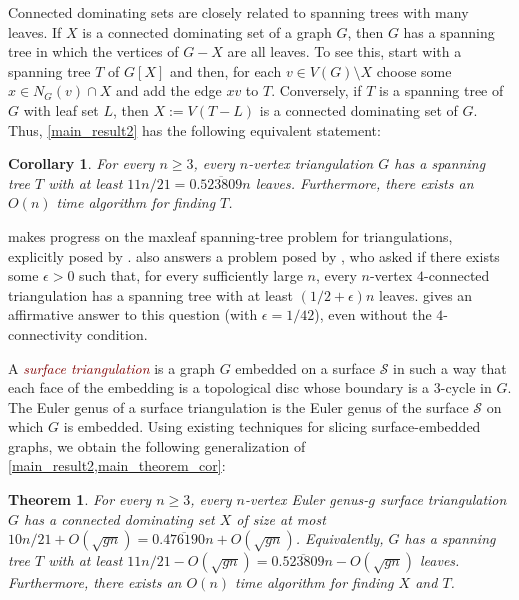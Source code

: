 \documentclass{article}
\newtheorem{thm}{Theorem}
\newtheorem{cor}{Corollary}
\newcommand{\defin}[1]{\emph{\textcolor{Maroon}{#1}}}
\theoremstyle{definition}
\begin{document}
Connected dominating sets are closely related to spanning trees with many leaves.  If $X$ is a connected dominating set of a graph $G$, then $G$ has a spanning tree in which the vertices of $G-X$ are all leaves.  To see this, start with a spanning tree $T$ of $G[X]$ and then, for each  $v\in V(G)\setminus X$ choose some $x\in N_G(v)\cap X$ and add the edge $xv$ to $T$. Conversely, if $T$ is a spanning tree of $G$ with leaf set $L$, then $X:=V(T-L)$ is a connected dominating set of $G$.  Thus, \cref{main_result2} has the following equivalent statement:

\begin{cor}\label{main_theorem_cor}
  For every $n\ge 3$, every $n$-vertex triangulation $G$ has a spanning tree $T$ with at least $11n/21= 0.\overline{523809}n$ leaves. Furthermore, there exists an $O(n)$ time algorithm for finding $T$.
\end{cor}

 makes progress on the maxleaf spanning-tree problem for triangulations, explicitly posed by \citet[Question~4.2]{bradshaw.masarik.ea:robust}.   also answers a problem posed by \citet{noguchi.zamfirescu:spanning}, who asked if there exists some $\epsilon >0$ such that, for every sufficiently large $n$, every $n$-vertex $4$-connected triangulation has a spanning tree with at least $(1/2+\epsilon)n$ leaves.   gives an affirmative answer to this question (with $\epsilon=1/42$), even without the $4$-connectivity condition.

A \defin{surface triangulation} is a graph $G$ embedded on a surface $\mathcal{S}$ in such a way that each face of the embedding is a topological disc whose boundary is a $3$-cycle in $G$.  The Euler genus of a surface triangulation is the Euler genus of the surface $\mathcal{S}$ on which $G$ is embedded.  Using existing techniques for slicing surface-embedded graphs, we obtain the following generalization of \cref{main_result2,main_theorem_cor}:

\begin{thm}\label{genus_result}
  For every $n\ge 3$, every $n$-vertex Euler genus-$g$ surface triangulation $G$ has a connected dominating set $X$ of size at most $10n/21 +O(\sqrt{gn})= 0.\overline{476190}n + O(\sqrt{gn})$.  Equivalently, $G$ has a spanning tree $T$ with at least $11n/21 -O(\sqrt{gn})=0.\overline{523809}n-O(\sqrt{gn})$ leaves.  Furthermore, there exists an $O(n)$ time algorithm for finding $X$ and $T$.
\end{thm}
\end{document}
